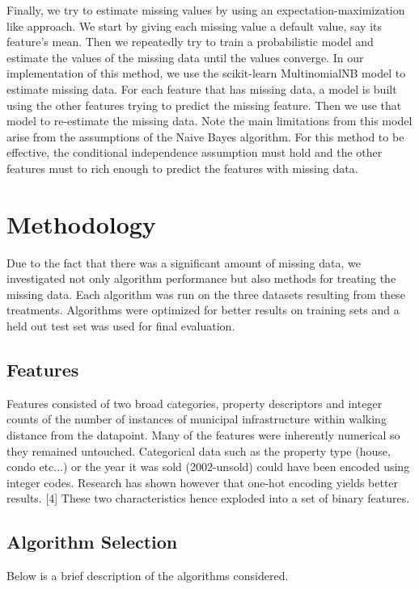 \documentclass{acm_proc_article-sp}
\begin{document}
	Finally, we try to estimate missing values by using an expectation-maximization like approach. We start by giving each missing value a default value, say its feature's mean. Then we repeatedly try to train a probabilistic model and estimate the values of the missing data until the values converge. In our implementation of this method, we use the scikit-learn MultinomialNB model to estimate missing data. For each feature that has missing data, a model is built using the other features trying to predict the missing feature. Then we use that model to re-estimate the missing data. Note the main limitations from this model arise from the assumptions of the Naive Bayes algorithm. For this method to be effective, the conditional independence assumption must hold and the other features must to rich enough to predict the features with missing data.
	
\section{Methodology}
	
	Due to the fact that there was a significant amount of missing data, we investigated not only algorithm performance but also methods for treating the missing data. Each algorithm was run on the three datasets resulting from these treatments. Algorithms were optimized for better results on training sets and a held out test set was used for final evaluation.
	
\subsection{Features}
	
	Features consisted of two broad categories, property descriptors and integer counts of the number of instances of municipal infrastructure within walking distance from the datapoint. Many of the features were inherently numerical so they remained untouched. Categorical data such as the property type (house, condo etc...) or the year it was sold (2002-unsold) could have been encoded using integer codes. Research has shown however that one-hot encoding yields better results. [4] These two characteristics hence exploded into a set of binary features.
	
\subsection{Algorithm Selection}
	Below is a brief description of the algorithms considered.
	
\end{document}
